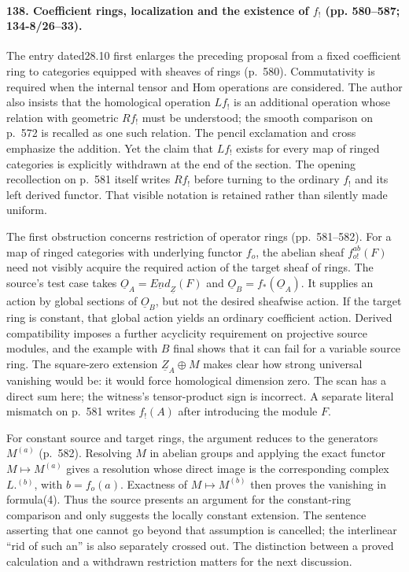 \paragraph{138. Coefficient rings, localization and the existence of $f_!$ (pp. 580--587; 134-8/26--33).}
The entry dated28.10 first enlarges the preceding proposal from a fixed coefficient ring to categories equipped with sheaves of rings (p.~580). Commutativity is required when the internal tensor and Hom operations are considered. The author also insists that the homological operation $Lf_!$ is an additional operation whose relation with geometric $Rf_!$ must be understood; the smooth comparison on p.~572 is recalled as one such relation. The pencil exclamation and cross emphasize the addition. Yet the claim that $Lf_!$ exists for every map of ringed categories is explicitly withdrawn at the end of the section. The opening recollection on p.~581 itself writes $Rf_!$ before turning to the ordinary $f_!$ and its left derived functor. That visible notation is retained rather than silently made uniform.

The first obstruction concerns restriction of operator rings (pp.~581--582). For a map of ringed categories with underlying functor $f_o$, the abelian sheaf $f^{ab}_{o!}(F)$ need not visibly acquire the required action of the target sheaf of rings. The source's test case takes $\underline O_A=\underline{End}_{\underline Z}(F)$ and $\underline O_B=f_*(\underline O_A)$. It supplies an action by global sections of $\underline O_B$, but not the desired sheafwise action. If the target ring is constant, that global action yields an ordinary coefficient action. Derived compatibility imposes a further acyclicity requirement on projective source modules, and the example with $B$ final shows that it can fail for a variable source ring. The square-zero extension $\underline Z_A\oplus M$ makes clear how strong universal vanishing would be: it would force homological dimension zero. The scan has a direct sum here; the witness's tensor-product sign is incorrect. A separate literal mismatch on p.~581 writes $f_!(A)$ after introducing the module $F$.

For constant source and target rings, the argument reduces to the generators $M^{(a)}$ (p.~582). Resolving $M$ in abelian groups and applying the exact functor $M\mapsto M^{(a)}$ gives a resolution whose direct image is the corresponding complex $L.^{(b)}$, with $b=f_o(a)$. Exactness of $M\mapsto M^{(b)}$ then proves the vanishing in formula(4). Thus the source presents an argument for the constant-ring comparison and only suggests the locally constant extension. The sentence asserting that one cannot go beyond that assumption is cancelled; the interlinear ``rid of such an'' is also separately crossed out. The distinction between a proved calculation and a withdrawn restriction matters for the next discussion.

